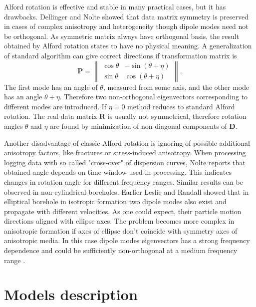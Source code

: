 \documentclass[a4paper,11pt]{article}
\begin{document}
Alford rotation is effective and stable in many practical cases, but it has drawbacks. Dellinger and Nolte \cite{Dellinger1997} showed that data matrix symmetry is preserved in cases of complex anisotropy and heterogeneity though dipole modes need not be orthogonal. As symmetric matrix always have orthogonal basis, the result obtained by Alford rotation states to have no physical meaning. A generalization of standard algorithm can give correct directions if transformation matrix \cite{Dellinger1998} is 
\begin{equation*}
\mathbf{P} = \left\|
\begin{array}{cc}
\cos \theta & -\sin (\theta+\eta) \\ 
\sin \theta & \cos (\theta+\eta)
\end{array} 
\right\|.
\end{equation*}
The first mode has an angle of $\theta$, measured from some axis, and the other mode has an angle $\theta+\eta$. Therefore two non-orthogonal eigenvectors corresponding to different modes are introduced. If $\eta=0$ method reduces to standard Alford rotation. The real data matrix $\mathbf{R}$ is usually not symmetrical, therefore rotation angles $\theta$ and $\eta$ are found by minimization of non-diagonal components of $\mathbf{D}$.

Another disadvantage of classic Alford rotation is ignoring of possible additional anisotropy factors, like fractures or stress-induced anisotropy. When processing logging data with so called "cross-over" of dispersion curves, Nolte \cite{Nolte1997} reports that obtained angle depends on time window used in processing. This indicates changes in rotation angle for different frequency ranges. Similar results can be observed in non-cylindrical boreholes. Earlier Leslie and Randall \cite{Leslie1992} showed that in elliptical borehole in isotropic formation two dipole modes also exist and propagate with different velocities. As one could expect, their particle motion directions aligned with ellipse axes. The problem becomes more complex in anisotropic formation if axes of ellipse don't coincide with symmetry axes of anisotropic media. In this case dipole modes eigenvectors has a strong frequency dependence and could be sufficiently non-orthogonal at a medium frequency range \cite{Zharnikov2015}.

\section{Models description}
\end{document}
